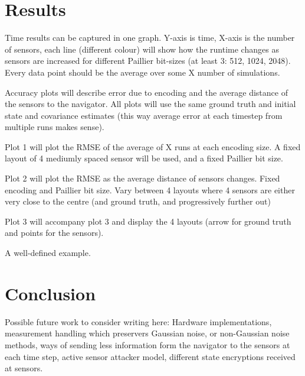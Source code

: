 \documentclass[twocolumn]{autart}
\theoremstyle{definition}
\theoremstyle{remark}
\begin{document}
\section{Results}
Time results can be captured in one graph. Y-axis is time, X-axis is the number of sensors, each line (different colour) will show how the runtime changes as sensors are increased for different Paillier bit-sizes (at least 3: 512, 1024, 2048). Every data point should be the average over some X number of simulations.

Accuracy plots will describe error due to encoding and the average distance of the sensors to the navigator. All plots will use the same ground truth and initial state and covariance estimates (this way average error at each timestep from multiple runs makes sense).

Plot 1 will plot the RMSE of the average of X runs at each encoding size. A fixed layout of 4 mediumly spaced sensor will be used, and a fixed Paillier bit size.

Plot 2 will plot the RMSE as the average distance of sensors changes. Fixed encoding and Paillier bit size. Vary between 4 layouts where 4 sensors are either very close to the centre (and ground truth, and progressively further out)

Plot 3 will accompany plot 3 and display the 4 layouts (arrow for ground truth and points for the sensors).

A well-defined example.

\section{Conclusion}
Possible future work to consider writing here:
Hardware implementations, measurement handling which preservers Gaussian noise, or non-Gaussian noise methods, ways of sending less information form the navigator to the sensors at each time step, active sensor attacker model, different state encryptions received at sensors.



\end{document}
